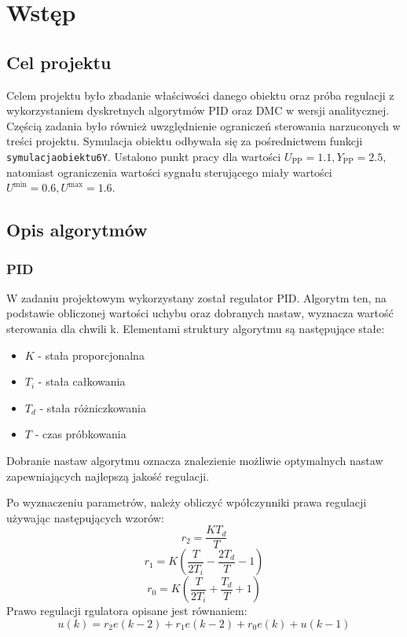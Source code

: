 \chapter{Wstęp}
\section{Cel projektu}
Celem projektu było zbadanie właściwości danego obiektu oraz próba regulacji z wykorzystaniem dyskretnych algorytmów PID oraz DMC w wersji analitycznej. Częścią zadania było również uwzględnienie ograniczeń sterowania narzuconych w treści projektu.
\newline Symulacja obiektu odbywała się za pośrednictwem funkcji \texttt{symulacja\textunderscore obiektu6Y}.
Ustalono punkt pracy dla wartości $U_{\textrm{PP}} = \num{1.1}, Y_{\textrm{PP}} = \num{2.5}$, natomiast ograniczenia wartości sygnału sterującego miały wartości $U^{\textrm{min}} = \num{0.6}, U^{\textrm{max}} = \num{1.6}$.

\section{Opis algorytmów}
\subsection{PID}
W zadaniu projektowym wykorzystany został regulator PID. Algorytm ten, na podstawie obliczonej wartości uchybu oraz dobranych nastaw, wyznacza wartość sterowania dla chwili k. Elementami struktury algorytmu są następujące stałe:
\begin{itemize}
	\item $K$ - stała proporcjonalna
	\item $T_i$ - stała całkowania
	\item $T_d$ - stała różniczkowania
	\item $T$ - czas próbkowania
\end{itemize}

Dobranie nastaw algorytmu oznacza znalezienie możliwie optymalnych nastaw zapewniających najlepszą jakość regulacji.
\par Po wyznaczeniu parametrów, należy obliczyć wpółczynniki prawa regulacji używając następujących wzorów:
\begin{equation}
    r_2 = \frac{KT_d}{T}
\end{equation}
\begin{equation}
    r_1 = K(\frac{T}{2T_i}-\frac{2T_d}{T}-1)
\end{equation}
\begin{equation}
    r_0 = K(\frac{T}{2T_i}+\frac{T_d}{T}+1)
\end{equation}
Prawo regulacji rgulatora opisane jest równaniem:
\begin{equation}
    u(k) = r_2e(k-2)+r_1e(k-2)+r_0e(k) +u(k-1)
\end{equation}


